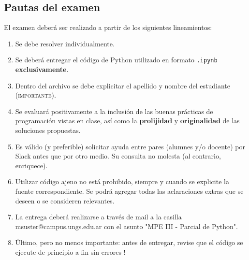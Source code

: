 \documentclass[a4paper,11pt]{article}
\begin{document}
\subsection*{Pautas del examen}
El examen deberá ser realizado a partir de los siguientes lineamientos:
\begin{enumerate}
	\item Se debe resolver individualmente. 
	\item Se deberá entregar el código de Python utilizado en formato \texttt{.ipynb} \textbf{exclusivamente}.
	\item Dentro del archivo se debe explicitar el apellido y nombre del estudiante (\textsc{importante}).
	\item Se evaluará positivamente a la inclusión de las buenas prácticas de programación vistas en clase, así como la \textbf{prolijidad} y \textbf{originalidad} de las soluciones propuestas.
	\item Es válido (y preferible) solicitar ayuda entre pares (alumnes y/o docente) por Slack antes que por otro medio. Su consulta no molesta (al contrario, enriquece).
	\item Utilizar código ajeno no está prohibido, siempre y cuando se explicite la fuente correspondiente. Se podrá agregar todas las aclaraciones extras que se deseen o se consideren relevantes.
	\item La entrega deberá realizarse a través de mail a la casilla msuster@campus.ungs.edu.ar con el asunto "MPE III - Parcial de Python".
	\item Último, pero no menos importante: antes de entregar, revise que el código se ejecute de principio a fin sin errores !
\end{enumerate}
\end{document}
